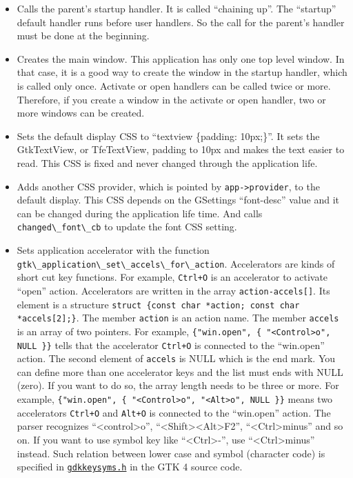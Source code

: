 \begin{itemize}
\tightlist
\item
  Calls the parent's startup handler. It is called ``chaining up''. The
  ``startup'' default handler runs before user handlers. So the call for
  the parent's handler must be done at the beginning.
\item
  Creates the main window. This application has only one top level
  window. In that case, it is a good way to create the window in the
  startup handler, which is called only once. Activate or open handlers
  can be called twice or more. Therefore, if you create a window in the
  activate or open handler, two or more windows can be created.
\item
  Sets the default display CSS to ``textview \{padding: 10px;\}''. It
  sets the GtkTextView, or TfeTextView, padding to 10px and makes the
  text easier to read. This CSS is fixed and never changed through the
  application life.
\item
  Adds another CSS provider, which is pointed by
  \passthrough{\lstinline!app->provider!}, to the default display. This
  CSS depends on the GSettings ``font-desc'' value and it can be changed
  during the application life time. And calls
  \passthrough{\lstinline!changed\_font\_cb!} to update the font CSS
  setting.
\item
  Sets application accelerator with the function
  \passthrough{\lstinline!gtk\_application\_set\_accels\_for\_action!}.
  Accelerators are kinds of short cut key functions. For example,
  \passthrough{\lstinline!Ctrl+O!} is an accelerator to activate
  ``open'' action. Accelerators are written in the array
  \passthrough{\lstinline!action-accels[]!}. Its element is a structure
  \passthrough{\lstinline!struct \{const char *action; const char *accels[2];\}!}.
  The member \passthrough{\lstinline!action!} is an action name. The
  member \passthrough{\lstinline!accels!} is an array of two pointers.
  For example,
  \passthrough{\lstinline!\{"win.open", \{ "<Control>o", NULL \}\}!}
  tells that the accelerator \passthrough{\lstinline!Ctrl+O!} is
  connected to the ``win.open'' action. The second element of
  \passthrough{\lstinline!accels!} is NULL which is the end mark. You
  can define more than one accelerator keys and the list must ends with
  NULL (zero). If you want to do so, the array length needs to be three
  or more. For example,
  \passthrough{\lstinline!\{"win.open", \{ "<Control>o", "<Alt>o", NULL \}\}!}
  means two accelerators \passthrough{\lstinline!Ctrl+O!} and
  \passthrough{\lstinline!Alt+O!} is connected to the ``win.open''
  action. The parser recognizes ``\textless control\textgreater o'',
  ``\textless Shift\textgreater\textless Alt\textgreater F2'',
  ``\textless Ctrl\textgreater minus'' and so on. If you want to use
  symbol key like ``\textless Ctrl\textgreater-'', use
  ``\textless Ctrl\textgreater minus'' instead. Such relation between
  lower case and symbol (character code) is specified in
  \href{https://gitlab.gnome.org/GNOME/gtk/-/blob/master/gdk/gdkkeysyms.h}{\passthrough{\lstinline!gdkkeysyms.h!}}
  in the GTK 4 source code.
\end{itemize}

